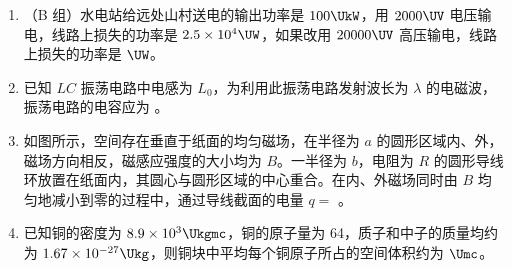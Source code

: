 \documentclass[\gkver]{gaokaozhenti}
\begin{document}
\begin{enumerate}
\jdanswer{
$4.5\UO$
}

\item
（B 组）水电站给远处山村送电的输出功率是 $100\UkW$，用 $2000\UV$ 电压输电，线路上损失的功率是 $2.5\times10^{4}\UW$，如果改用 $20000\UV$ 高压输电，线路上损失的功率是  $\UW$。

\jdanswer{
$250\UW$
}

\item
已知 $LC$ 振荡电路中电感为 $L_{0}$，为利用此振荡电路发射波长为 $\lambda$ 的电磁波，振荡电路的电容应为 。


\item
如图所示，空间存在垂直于纸面的均匀磁场，在半径为 $a$ 的圆形区域内、外，磁场方向相反，磁感应强度的大小均为 $B$。一半径为 $b$，电阻为 $R$ 的圆形导线环放置在纸面内，其圆心与圆形区域的中心重合。在内、外磁场同时由 $B$ 均匀地减小到零的过程中，通过导线截面的电量 $q =$ 。
\onepicture[align=right, w=4.5cm]{}


\item
已知铜的密度为 $8.9\times10^{3}\Ukgmc$，铜的原子量为 64，质子和中子的质量均约为 $1.67\times10^{-27}\Ukg$，则铜块中平均每个铜原子所占的空间体积约为  $\Umc$。


\end{enumerate}
\end{document}
